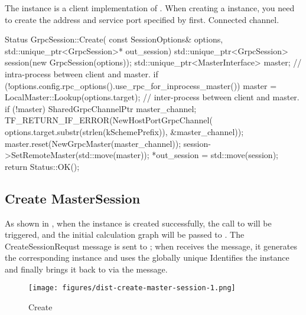 \begin{content}
The  instance is a client implementation of . When creating a  instance, you need to create the  address and service port specified by  first. Connected  channel.

\begin{leftbar}
\begin{c++}
Status GrpcSession::Create(
    const SessionOptions& options,
    std::unique_ptr<GrpcSession>* out_session) {
  std::unique_ptr<GrpcSession> session(new GrpcSession(options));
  std::unique_ptr<MasterInterface> master;
  // intra-process between client and master.
  if (!options.config.rpc_options().use_rpc_for_inprocess_master()) {
    master = LocalMaster::Lookup(options.target);
  }
  // inter-process between client and master.
  if (!master) {
    SharedGrpcChannelPtr master_channel;
    TF_RETURN_IF_ERROR(NewHostPortGrpcChannel(
        options.target.substr(strlen(kSchemePrefix)), &master_channel));
    master.reset(NewGrpcMaster(master_channel));
  }
  session->SetRemoteMaster(std::move(master));
  *out_session = std::move(session);
  return Status::OK();
}
\end{c++}
\end{leftbar}


\subsection{Create MasterSession}
As shown in , when the  instance is created successfully, the call to  will be triggered, and the initial calculation graph will be passed to \code. The {CreateSessionRequst} message is sent to ; when  receives the  message, it generates the corresponding  instance and uses the globally unique  Identifies the instance and finally brings it back to  via the  message.

\begin{figure}[H]
  \centering
  \texttt{[image: figures/dist-create-master-session-1.png]}
  \caption{Create}
  \label{fig:dist-create-master-session-1}
\end{figure}




\end{content}
